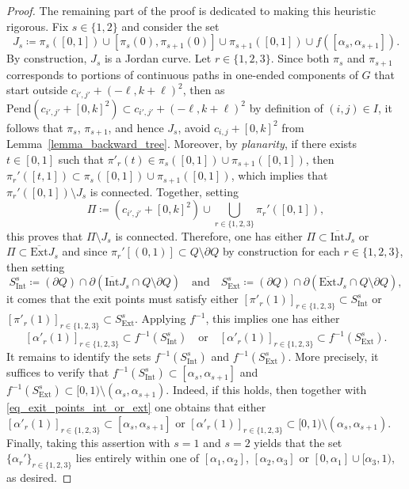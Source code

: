 \documentclass[a4paper, 11pt]{article} %
\theoremstyle{plain}
\newcommand{\backward}{\mathrm{Pend}}
\newcommand{\Int}{\mathrm{Int}}
\newcommand{\clInt}{\overline{\mathrm{Int}}}
\newcommand{\Ext}{\mathrm{Ext}}
\newcommand{\clExt}{\overline{\mathrm{Ext}}}
\newcommand{\1}{\mathds 1}
\numberwithin{equation}{section}
\begin{document}
\begin{proof}
    The remaining part of the proof is dedicated to making this heuristic rigorous. Fix $s\in\{1,2\}$ and consider the set
        \[J_s\coloneqq\pi_s([0,1])\cup[\pi_s(0),\pi_{s+1}(0)]\cup\pi_{s+1}([0,1])\cup f([\alpha_s,\alpha_{s+1}]).\]
    By construction, $J_s$ is a Jordan curve. Let $r\in\{1,2,3\}$. Since both $\pi_s$ and $\pi_{s+1}$ corresponds to portions of continuous paths in one-ended components of $G$ that start outside $c_{i', j'}+(-\ell,k+\ell)^2$, then as $\backward(c_{i', j'}+[0,k]^2)\subset c_{i', j'}+(-\ell,k+\ell)^2$ by definition of $(i, j)\in I$, it follows that $\pi_s$, $\pi_{s+1}$, and hence $J_s$, avoid $c_{i, j}+[0,k]^2$ from Lemma~\ref{lemma_backward_tree}. Moreover, by \emph{planarity}, if there exists $t\in[0,1]$ such that $\pi'_r(t)\in\pi_s([0,1])\cup\pi_{s+1}([0,1])$, then $\pi_r'([t,1])\subset \pi_s([0,1])\cup\pi_{s+1}([0,1])$, which implies that $\pi_r'([0,1])\setminus J_s$ is connected. Together, setting
        \[\Pi\coloneqq(c_{i', j'}+[0,k]^2)\cup\bigcup_{r\in\{1,2,3\}}\pi_r'([0,1]),\]
    this proves that $\Pi\setminus J_s$ is connected. Therefore, one has either $\Pi\subset\clInt J_s$ or $\Pi\subset\clExt J_s$ and since $\pi_r'[(0,1)]\subset Q\setminus\partial Q$ by construction for each $r\in\{1,2,3\}$, then setting
        \[S_\Int^s\coloneqq(\partial Q)\cap\partial(\clInt J_s\cap Q\setminus\partial Q)\quad\text{and}\quad S_\Ext^s\coloneqq(\partial Q)\cap\partial(\clExt J_s\cap Q\setminus\partial Q),\]
    it comes that the exit points must satisfy either $[\pi'_r(1)]_{r\in\{1,2,3\}}\subset S_\Int^s$ or $ [\pi'_r(1)]_{r\in\{1,2,3\}}\subset S_\Ext^s$. Applying $f^{-1}$, this implies one has either
        \begin{equation}
            \label{eq_exit_points_int_or_ext}
            [\alpha'_r(1)]_{r\in\{1,2,3\}}\subset f^{-1}(S_\Int^s)\quad\text{or}\quad [\alpha'_r(1)]_{r\in\{1,2,3\}}\subset f^{-1}(S_\Ext^s).
        \end{equation}
    It remains to identify the sets $f^{-1}(S_\Int^s)$ and $f^{-1}(S_\Ext^s)$. More precisely, it suffices to verify that $f^{-1}(S_\Int^s)\subset[\alpha_s,\alpha_{s+1}]$ and $f^{-1}(S_\Ext^s)\subset[0,1)\setminus(\alpha_s,\alpha_{s+1})$. Indeed, if this holds, then together with \eqref{eq_exit_points_int_or_ext} one obtains that either $[\alpha'_r(1)]_{r\in\{1,2,3\}}\subset [\alpha_s,\alpha_{s+1}]$ or $[\alpha'_r(1)]_{r\in\{1,2,3\}}\subset[0,1)\setminus(\alpha_s,\alpha_{s+1})$. Finally, taking this assertion with $s=1$ and $s=2$ yields that the set $\{\alpha_r'\}_{r\in\{1,2,3\}}$ lies entirely within one of $[\alpha_1,\alpha_2]$, $[\alpha_2,\alpha_3]$ or $[0,\alpha_1]\cup[\alpha_3,1)$, as desired.
    

\end{proof}
\end{document}
